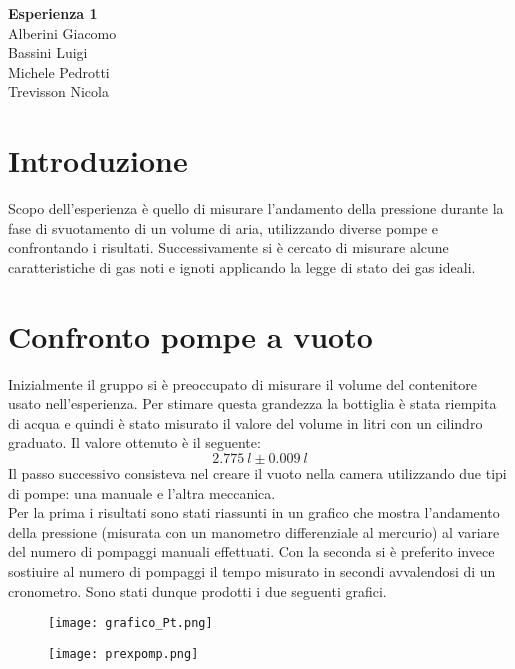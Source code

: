 \documentclass[a4paper,11pt]{article}
\begin{document}
\begin{center}
\textbf{\huge Esperienza 1} \\ \vspace{10pt}
\large Alberini Giacomo \\ Bassini Luigi \\ Michele Pedrotti\\ Trevisson Nicola 
\end{center}

\section{Introduzione}
Scopo dell'esperienza è quello di misurare l'andamento della pressione durante la fase di svuotamento di un volume di aria, utilizzando diverse pompe e confrontando i risultati. Successivamente si è cercato di misurare alcune caratteristiche di gas noti e ignoti applicando la legge di stato dei gas ideali. 
\section{Confronto pompe a vuoto}

Inizialmente il gruppo si è preoccupato di misurare il volume del contenitore usato nell'esperienza. Per stimare questa grandezza la bottiglia è stata riempita di acqua e quindi è stato misurato il valore del volume in litri con un cilindro graduato. Il valore ottenuto è il seguente:
$$2.775  ~l\pm 0.009 ~l$$
Il passo successivo consisteva nel creare il vuoto nella camera utilizzando due tipi di pompe: una manuale e l'altra meccanica. \\
Per la prima i risultati sono stati riassunti in un grafico che mostra l'andamento della pressione (misurata con un manometro differenziale al mercurio) al variare del numero di pompaggi manuali effettuati. Con la seconda si è preferito invece sostiuire al numero di pompaggi il tempo misurato in secondi avvalendosi di un cronometro. Sono stati dunque prodotti i due seguenti grafici.

\begin{figure}[htbp]
\centering
\texttt{[image: grafico\_Pt.png]}
\label{}
\end{figure}

\begin{figure}[htbp]
\centering
\texttt{[image: prexpomp.png]}
\label{}
\end{figure}
\end{document}
